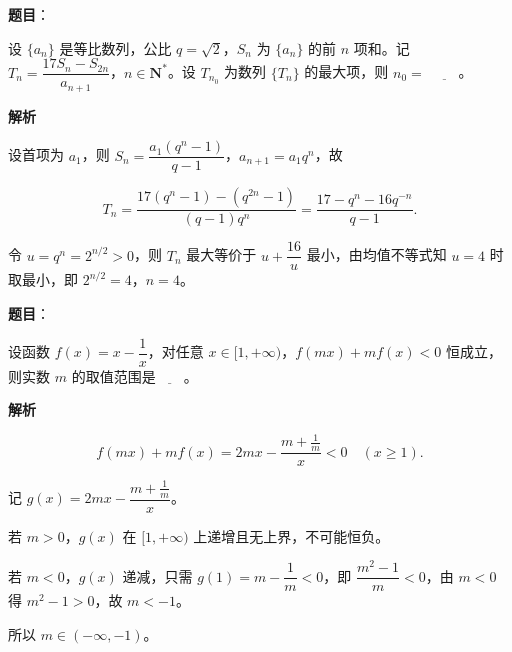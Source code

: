 \begin{answer}

\textbf{题目}：

设 $\{a_n\}$ 是等比数列，公比 $q=\sqrt2$，$S_n$ 为 $\{a_n\}$ 的前 $n$ 项和。记 $T_n=\dfrac{17S_n-S_{2n}}{a_{n+1}}$，$n\in\mathbf N^*$。设 $T_{n_0}$ 为数列 $\{T_n\}$ 的最大项，则 $n_0=$ $\underline{\qquad}$。

\textbf{解析}

设首项为 $a_1$，则 $S_n=\dfrac{a_1(q^n-1)}{q-1}$，$a_{n+1}=a_1q^n$，故

\nopagebreak[4]
\[T_n=\frac{17(q^n-1)-(q^{2n}-1)}{(q-1)q^n}
=\frac{17-q^n-16q^{-n}}{q-1}.\]

令 $u=q^n=2^{n/2}>0$，则 $T_n$ 最大等价于 $u+\dfrac{16}u$ 最小，由均值不等式知 $u=4$ 时取最小，即 $2^{n/2}=4$，$n=4$。


\end{answer}
\begin{answer}

\textbf{题目}：

设函数 $f(x)=x-\dfrac1x$，对任意 $x\in[1,+\infty)$，$f(mx)+mf(x)<0$ 恒成立，则实数 $m$ 的取值范围是$\underline{\qquad}$。

\textbf{解析}

\nopagebreak[4]
\[f(mx)+mf(x)=2mx-\frac{m+\frac1m}{x}<0\quad(x\geqslant1).\]

记 $g(x)=2mx-\dfrac{m+\frac1m}{x}$。

若 $m>0$，$g(x)$ 在 $[1,+\infty)$ 上递增且无上界，不可能恒负。

若 $m<0$，$g(x)$ 递减，只需 $g(1)=m-\dfrac1m<0$，即 $\dfrac{m^2-1}{m}<0$，由 $m<0$ 得 $m^2-1>0$，故 $m<-1$。

所以 $m\in(-\infty,-1)$。


\end{answer}
